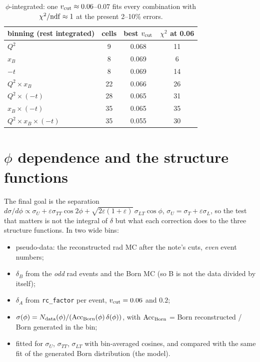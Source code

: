 \documentclass[11pt]{article}
\newcommand{\vcut}{v_{\rm cut}}
\begin{document}
\begin{table}[H]\centering
\begin{tabular}{lccc}\toprule
binning (rest integrated) & cells & best $\vcut$ & $\chi^2$ at 0.06\\\midrule
$Q^2$ & 9 & 0.068 & 11\\
$x_B$ & 8 & 0.069 & 6\\
$-t$ & 8 & 0.069 & 14\\
$Q^2\times x_B$ & 22 & 0.066 & 26\\
$Q^2\times(-t)$ & 28 & 0.065 & 31\\
$x_B\times(-t)$ & 35 & 0.065 & 35\\
$Q^2\times x_B\times(-t)$ & 35 & 0.055 & 30\\\bottomrule
\end{tabular}
\caption{$\phi$-integrated: one $\vcut\approx0.06$--$0.07$ fits every combination with
$\chi^2/{\rm ndf}\approx1$ at the present 2--10\% errors.}
\end{table}

\section{$\phi$ dependence and the structure functions}
\label{sec:phifit}
The final goal is the separation
$d\sigma/d\phi\propto\sigma_U+\varepsilon\sigma_{TT}\cos2\phi+\sqrt{2\varepsilon(1+\varepsilon)}\,\sigma_{LT}\cos\phi$,
$\sigma_U=\sigma_T+\varepsilon\sigma_L$, so the test that matters is not the integral of $\delta$ but
what each correction does to the three structure functions. In two wide bins:

\begin{itemize}
\item pseudo-data: the reconstructed rad MC after the note's cuts, \emph{even} event numbers;
\item $\delta_B$ from the \emph{odd} rad events and the Born MC (so B is not the data divided by itself);
\item $\delta_A$ from \texttt{rc\_factor} per event, $\vcut=0.06$ and $0.2$;
\item $\sigma(\phi)=N_{\rm data}(\phi)/({\rm Acc}_{\rm Born}(\phi)\,\delta(\phi))$, with
  ${\rm Acc}_{\rm Born}$ = Born reconstructed / Born generated in the bin;
\item fitted for $\sigma_U$, $\sigma_{TT}$, $\sigma_{LT}$ with bin-averaged cosines, and compared with
  the same fit of the generated Born distribution (the model).
\end{itemize}
\end{document}
